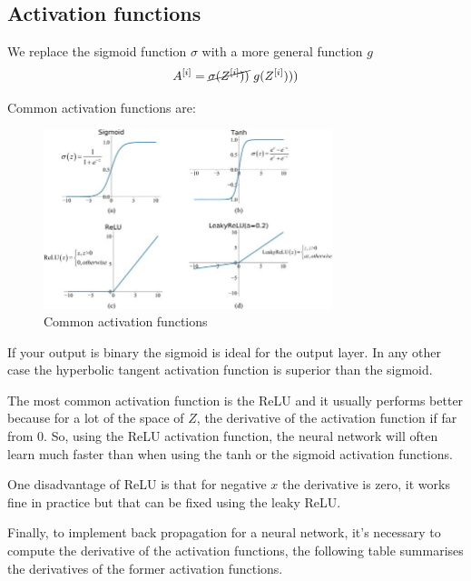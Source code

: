 \subsection*{Activation functions}

    We replace the sigmoid function $\sigma$ with a more general function $g$ 
    \begin{align*}
        A^{[i]} = \cancel{\sigma(Z^{[i]}))} \ g(Z^{[i]})))
    \end{align*}

    Common activation functions are:
    \begin{figure}[H]
        \begin{center}
                \includegraphics[width=0.75\textwidth]{img/activations.jpg}
                \caption{Common activation functions}
            \end{center}
    \end{figure}
    If your output is binary the sigmoid is ideal for the output layer. In any other case the
    hyperbolic tangent activation function is superior than the sigmoid.

    The most common activation function is the ReLU and it usually performs better because
    for a lot of the space of $Z$, the derivative of the activation function if far from 0.
    So, using the ReLU activation function, the neural network will often learn much faster 
    than when using the tanh or the sigmoid activation functions. 

    One disadvantage of ReLU is that for negative $x$ the derivative is zero, it works fine 
    in practice but that can be fixed using the leaky ReLU.

    Finally, to implement back propagation for a neural network, it's necessary to 
    compute the derivative of the activation functions, the following table summarises the 
    derivatives of the former activation functions.


